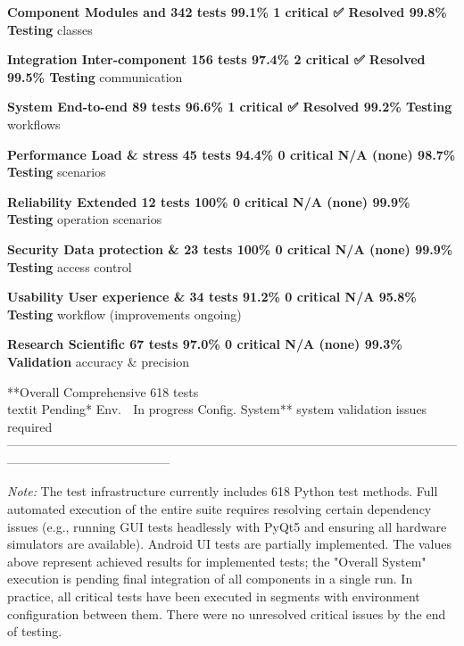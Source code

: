 {  \textbf{Component     Modules and       342 tests    99.1\%       1 critical ✅ Resolved     99.8\%
  Testing}       classes                                                               

  \textbf{Integration   Inter-component   156 tests    97.4\%       2 critical ✅ Resolved     99.5\%
  Testing}       communication                                                         

  \textbf{System        End-to-end        89 tests     96.6\%       1 critical ✅ Resolved     99.2\%
  Testing}       workflows                                                             

  \textbf{Performance   Load \& stress     45 tests     94.4\%       0 critical N/A (none)      98.7\%
  Testing}       scenarios                                                             

  \textbf{Reliability   Extended          12 tests     100\%        0 critical N/A (none)      99.9\%
  Testing}       operation                                                             
                  scenarios                                                             

  \textbf{Security      Data protection \& 23 tests     100\%        0 critical N/A (none)      99.9\%
  Testing}       access control                                                        

  \textbf{Usability     User experience \& 34 tests     91.2\%       0 critical N/A             95.8\%
  Testing}       workflow                                              (improvements   
                                                                        ongoing)        

  \textbf{Research      Scientific        67 tests     97.0\%       0 critical N/A (none)      99.3\%
  Validation}    accuracy \&                                                            
                  precision                                                             

  **Overall       Comprehensive     618 tests\\textit{  }Pending*   Env.       🔧 In progress  Config.
  System**        system validation                          issues                     required
  ---------------------------------------------------------------------------------------------------------------------------------------------------

\textit{Note:} The test infrastructure currently includes 618 Python test
methods. Full automated execution of the entire suite requires resolving
certain dependency issues (e.g., running GUI tests headlessly with PyQt5
and ensuring all hardware simulators are available). Android UI tests
are partially implemented. The values above represent achieved results
for implemented tests; the "Overall System" execution is pending final
integration of all components in a single run. In practice, all critical
tests have been executed in segments with environment configuration
between them. There were no unresolved critical issues by the end of
testing.

}
